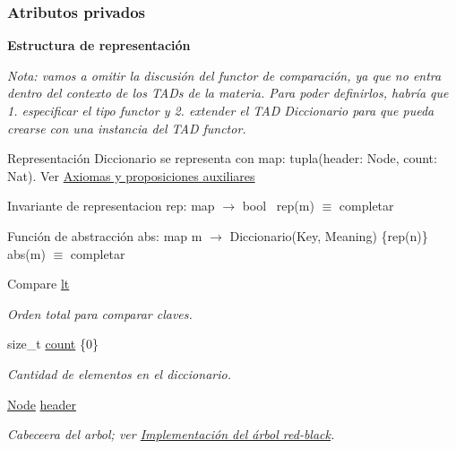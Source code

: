 \subsubsection*{Atributos privados}
\begin{Indent}\textbf{ Estructura de representación}\par
{\em Nota\+: vamos a omitir la discusión del functor de comparación, ya que no entra dentro del contexto de los T\+A\+Ds de la materia. Para poder definirlos, habría que 1. especificar el tipo functor y 2. extender el T\+AD Diccionario para que pueda crearse con una instancia del T\+AD functor.

\begin{DoxyParagraph}{Representación}
Diccionario se representa con map\+: tupla(header\+: Node, count\+: Nat). Ver \hyperlink{axiomas}{Axiomas y proposiciones auxiliares}
\end{DoxyParagraph}
\begin{DoxyParagraph}{Invariante de representacion}
rep\+: map $\to$ bool~\newline
rep(m) $\equiv$ completar 
\end{DoxyParagraph}


\begin{DoxyParagraph}{Función de abstracción}
abs\+: map m $\to$ Diccionario(Key, Meaning) \{rep(n)\}~\newline
abs(m) $\equiv$ completar 
\end{DoxyParagraph}
}\begin{DoxyCompactItemize}
\item 
Compare \hyperlink{classaed2_1_1iterator_a3f219bfe5e047bbec03e3339770ae414_a3f219bfe5e047bbec03e3339770ae414}{lt}
\begin{DoxyCompactList}\small\item\em Orden total para comparar claves. \end{DoxyCompactList}\item 
size\+\_\+t \hyperlink{classaed2_1_1iterator_aff9ce2dda625c35bf8fb834bd5d3ba31_aff9ce2dda625c35bf8fb834bd5d3ba31}{count} \{0\}
\begin{DoxyCompactList}\small\item\em Cantidad de elementos en el diccionario. \end{DoxyCompactList}\item 
\hyperlink{structaed2_1_1iterator_1_1Node}{Node} \hyperlink{classaed2_1_1iterator_a19db18e2e77583eb1fa819e854ff9c71_a19db18e2e77583eb1fa819e854ff9c71}{header}
\begin{DoxyCompactList}\small\item\em Cabeceera del arbol; ver \hyperlink{Implementacion}{Implementación del árbol red-\/black}. \end{DoxyCompactList}\end{DoxyCompactItemize}
\end{Indent}


